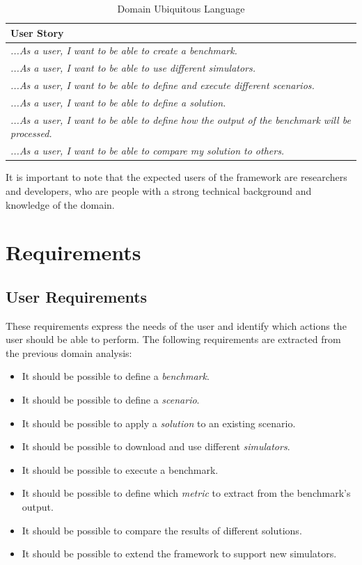 \documentclass[12pt,a4paper,openright,twoside]{book}
\begin{document}
\begin{table}[h]
  \centering
  \begin{tabular}{|p{}|}
    \toprule
    \textbf{User Story}                                                                                   \\
    \midrule
    \textit{...As a user, I want to be able to create a benchmark.}                                       \\ \hline
    \textit{...As a user, I want to be able to use different simulators.}                                 \\ \hline
    \textit{...As a user, I want to be able to define and execute different scenarios.}                   \\ \hline
    \textit{...As a user, I want to be able to define a solution.}                                        \\ \hline
    \textit{...As a user, I want to be able to define how the output of the benchmark will be processed.} \\ \hline
    \textit{...As a user, I want to be able to compare my solution to others.}                       \\ \hline
  \end{tabular}
  \caption{Domain Ubiquitous Language}
\end{table}

It is important to note that the expected users of the framework are researchers and developers,
who are people with a strong technical background and knowledge of the domain.

\section{Requirements}

\subsection*{User Requirements}
These requirements express the needs of the user and identify which actions the user should be able to perform.
The following requirements are extracted from the previous domain analysis:
\begin{itemize}
  \item It should be possible to define a \emph{benchmark}.
  \item It should be possible to define a \emph{scenario}.
  \item It should be possible to apply a \emph{solution} to an existing scenario.
  \item It should be possible to download and use different \emph{simulators}.
  \item It should be possible to execute a benchmark.
  \item It should be possible to define which \emph{metric} to extract from the benchmark's output.
  \item It should be possible to compare the results of different solutions.
  \item It should be possible to extend the framework to support new simulators.
\end{itemize}
\end{document}

